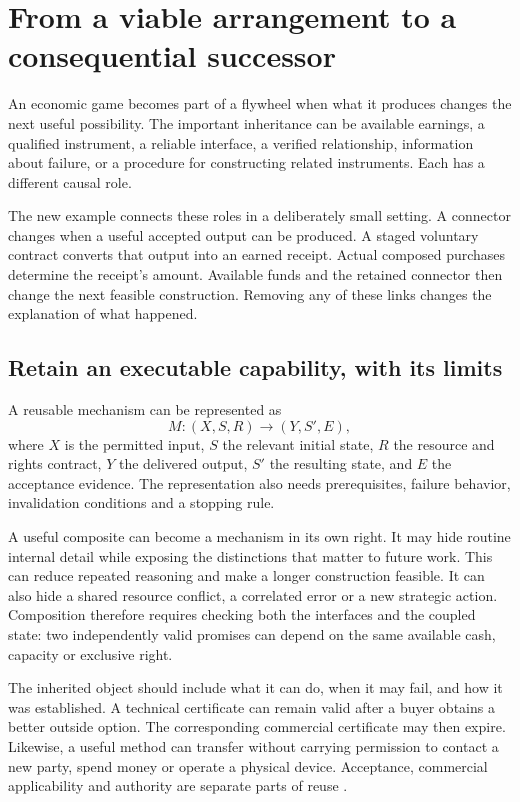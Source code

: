 \section{From a viable arrangement to a consequential successor}\label{sec:succession}
An economic game becomes part of a flywheel when what it produces changes the next useful possibility. The important inheritance can be available earnings, a qualified instrument, a reliable interface, a verified relationship, information about failure, or a procedure for constructing related instruments. Each has a different causal role.

The new example connects these roles in a deliberately small setting. A connector changes when a useful accepted output can be produced. A staged voluntary contract converts that output into an earned receipt. Actual composed purchases determine the receipt's amount. Available funds and the retained connector then change the next feasible construction. Removing any of these links changes the explanation of what happened.

\subsection{Retain an executable capability, with its limits}
A reusable mechanism can be represented as
\begin{equation}
M:(X,S,R)\longrightarrow(Y,S',E),
\end{equation}
where $X$ is the permitted input, $S$ the relevant initial state, $R$ the resource and rights contract, $Y$ the delivered output, $S'$ the resulting state, and $E$ the acceptance evidence. The representation also needs prerequisites, failure behavior, invalidation conditions and a stopping rule.

A useful composite can become a mechanism in its own right. It may hide routine internal detail while exposing the distinctions that matter to future work. This can reduce repeated reasoning and make a longer construction feasible. It can also hide a shared resource conflict, a correlated error or a new strategic action. Composition therefore requires checking both the interfaces and the coupled state: two independently valid promises can depend on the same available cash, capacity or exclusive right.

The inherited object should include what it can do, when it may fail, and how it was established. A technical certificate can remain valid after a buyer obtains a better outside option. The corresponding commercial certificate may then expire. Likewise, a useful method can transfer without carrying permission to contact a new party, spend money or operate a physical device. Acceptance, commercial applicability and authority are separate parts of reuse \cite{world,outevolve,foundation}.

